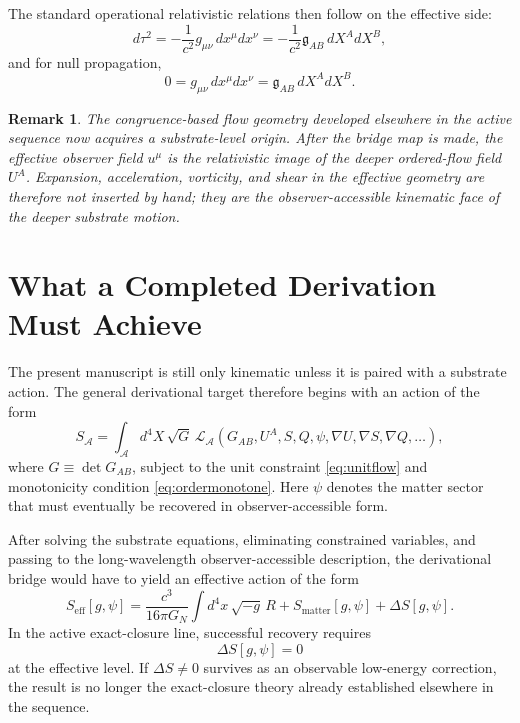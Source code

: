 \documentclass[11pt]{article}
\newcommand{\Sub}{\mathcal{A}}
\newcommand{\BridgeMetric}{\mathfrak{g}}
\newtheorem{remark}{Remark}
\begin{document}
The standard operational relativistic relations then follow on the effective side:
\begin{equation}
d\tau^2
=
-\frac{1}{c^2} g_{\mu\nu}\, dx^\mu dx^\nu
=
-\frac{1}{c^2} \BridgeMetric_{AB}\, dX^A dX^B,
\label{eq:bridgepropertime}
\end{equation}
and for null propagation,
\begin{equation}
0
=
g_{\mu\nu}\, dx^\mu dx^\nu
=
\BridgeMetric_{AB}\, dX^A dX^B.
\label{eq:bridgenull}
\end{equation}

\begin{remark}
The congruence-based flow geometry developed elsewhere in the active sequence now acquires a substrate-level origin. After the bridge map is made, the effective observer field \(u^\mu\) is the relativistic image of the deeper ordered-flow field \(U^A\). Expansion, acceleration, vorticity, and shear in the effective geometry are therefore not inserted by hand; they are the observer-accessible kinematic face of the deeper substrate motion.
\end{remark}

\section{What a Completed Derivation Must Achieve}

The present manuscript is still only kinematic unless it is paired with a substrate action. The general derivational target therefore begins with an action of the form
\begin{equation}
S_{\Sub}
=
\int_{\Sub} d^4X\,\sqrt{G}\,
\mathcal{L}_{\Sub}\!\left(
G_{AB},
U^A,
S,
Q,
\psi,
\nabla U,
\nabla S,
\nabla Q,
\ldots
\right),
\label{eq:substrateactionbridge}
\end{equation}
where \(G \equiv \det G_{AB}\), subject to the unit constraint \eqref{eq:unitflow} and monotonicity condition \eqref{eq:ordermonotone}. Here \(\psi\) denotes the matter sector that must eventually be recovered in observer-accessible form.

After solving the substrate equations, eliminating constrained variables, and passing to the long-wavelength observer-accessible description, the derivational bridge would have to yield an effective action of the form
\begin{equation}
S_{\mathrm{eff}}[g,\psi]
=
\frac{c^3}{16\pi G_N}\int d^4x\,\sqrt{-g}\,R
+
S_{\mathrm{matter}}[g,\psi]
+
\Delta S[g,\psi].
\label{eq:bridgeeffectiveaction}
\end{equation}
In the active exact-closure line, successful recovery requires
\begin{equation}
\Delta S[g,\psi] = 0
\label{eq:deltazero}
\end{equation}
at the effective level. If \(\Delta S\neq 0\) survives as an observable low-energy correction, the result is no longer the exact-closure theory already established elsewhere in the sequence.
\end{document}
